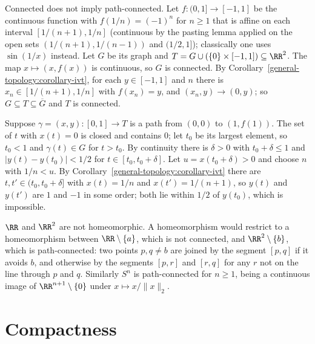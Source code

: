 \begin{counterexample}\label{general-topology:counterexample-sine-curve}
Connected does not imply path-connected. Let $f \colon (0, 1] \to [-1, 1]$ be the continuous function with $f(1/n) = (-1)^n$ for $n \geq 1$ that is
affine on each interval $[1/(n+1), 1/n]$ (continuous by the pasting lemma applied on the open sets $(1/(n+1), 1/(n-1))$ and $(1/2, 1]$); classically one
uses $\sin(1/x)$ instead. Let $G$ be its graph and $T = G \cup (\{0\} \times [-1, 1]) \subseteq \RR^2$. The map $x \mapsto (x, f(x))$ is continuous, so $G$ is
connected. By Corollary~\ref{general-topology:corollary-ivt}, for each $y \in [-1, 1]$ and $n$ there is $x_n \in [1/(n+1), 1/n]$ with $f(x_n) = y$, and
$(x_n, y) \to (0, y)$; so $G \subseteq T \subseteq \overline{G}$ and $T$ is connected.

Suppose $\gamma = (x, y) \colon [0, 1] \to T$ is a path from $(0, 0)$ to $(1, f(1))$. The set of $t$ with $x(t) = 0$ is closed and contains $0$; let $t_0$ be
its largest element, so $t_0 < 1$ and $\gamma(t) \in G$ for $t > t_0$. By continuity there is $\delta > 0$ with $t_0 + \delta \leq 1$ and
$|y(t) - y(t_0)| < 1/2$ for $t \in [t_0, t_0 + \delta]$. Let $u = x(t_0 + \delta) > 0$ and choose $n$ with $1/n < u$. By
Corollary~\ref{general-topology:corollary-ivt} there are $t, t' \in (t_0, t_0 + \delta]$ with $x(t) = 1/n$ and $x(t') = 1/(n+1)$, so $y(t)$ and $y(t')$
are $1$ and $-1$ in some order; both lie within $1/2$ of $y(t_0)$, which is impossible.
\end{counterexample}

\begin{example}\label{general-topology:example-r-not-r2}
$\RR$ and $\RR^2$ are not homeomorphic. A homeomorphism would restrict to a homeomorphism between $\RR \setminus \{a\}$, which is not connected, and
$\RR^2 \setminus \{b\}$, which is path-connected: two points $p, q \neq b$ are joined by the segment $[p, q]$ if it avoids $b$, and otherwise by the segments
$[p, r]$ and $[r, q]$ for any $r$ not on the line through $p$ and $q$. Similarly $S^n$ is path-connected for $n \geq 1$, being a continuous image of
$\RR^{n+1} \setminus \{0\}$ under $x \mapsto x/\|x\|_2$.
\end{example}

\section{Compactness}\label{general-topology:section-compactness}

